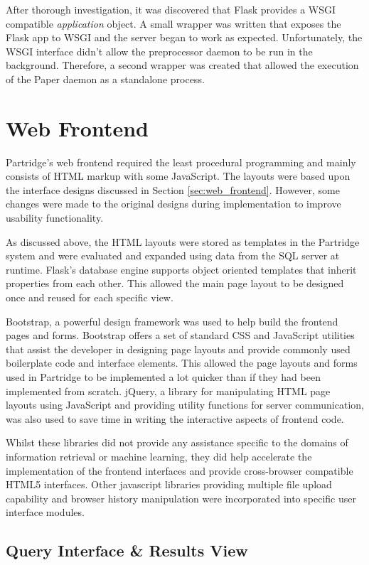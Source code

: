 After thorough investigation, it was discovered that Flask provides a WSGI
compatible \emph{application} object. A small wrapper was written that exposes
the Flask app to WSGI and the server began to work as expected. Unfortunately,
the WSGI interface didn't allow the preprocessor daemon to be run in the
background. Therefore, a second wrapper was created that allowed the execution
of the Paper daemon as a standalone process.

\section{Web Frontend}

Partridge's web frontend required the least procedural programming and mainly
consists of HTML markup with some JavaScript. The layouts were based upon the
interface designs discussed in Section \ref{sec:web_frontend}. However, some
changes were made to the original designs during implementation to improve
usability functionality.

As discussed above, the HTML layouts were stored as templates in the
Partridge system and were evaluated and expanded using data from the SQL
server at runtime. Flask's database engine supports object oriented templates
that inherit properties from each other. This allowed the main page layout to
be designed once and reused for each specific view. 

Bootstrap, a powerful design framework was used to help build the frontend
pages and forms. Bootstrap offers a set of standard CSS and JavaScript
utilities that assist the developer in designing page layouts and provide
commonly used boilerplate code and interface elements\cite{bootstrap2013}. This
allowed the page layouts and forms used in Partridge to be implemented a lot
quicker than if they had been implemented from scratch. jQuery, a library for
manipulating HTML page layouts using JavaScript and providing utility functions
for server communication, was also used to save time in writing the interactive
aspects of frontend code. 

Whilst these libraries did not provide any assistance specific to the domains
of information retrieval or machine learning, they did help accelerate the
implementation of the frontend interfaces and provide cross-browser compatible HTML5
interfaces. Other javascript libraries providing multiple file upload
capability and browser history manipulation were incorporated into specific
user interface modules.

\subsection{Query Interface \& Results View}

